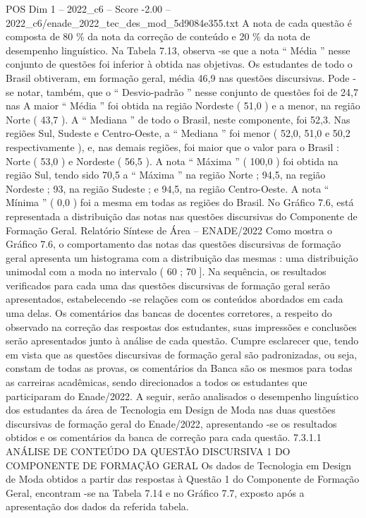 \begin{textsample}{POS Dim 1 – 2022\_c6 – Score -2.00 – 2022\_c6/enade\_2022\_tec\_des\_mod\_5d9084e355.txt}
A nota de cada questão é composta de 80 \% da nota da correção de conteúdo e 20 \% da nota de desempenho linguístico.
Na Tabela 7.13, observa -se que a nota “ Média ” nesse conjunto de questões foi inferior à obtida nas objetivas.
Os estudantes de todo o Brasil obtiveram, em formação geral, média 46,9 nas questões discursivas.
Pode -se notar, também, que o “ Desvio-padrão ” nesse conjunto de questões foi de 24,7 nas A maior “ Média ” foi obtida na região Nordeste ( 51,0 ) e a menor, na região Norte ( 43,7 ).
A “ Mediana ” de todo o Brasil, neste componente, foi 52,3.
Nas regiões Sul, Sudeste e Centro-Oeste, a “ Mediana ” foi menor ( 52,0, 51,0 e 50,2 respectivamente ), e, nas demais regiões, foi maior que o valor para o Brasil : Norte ( 53,0 ) e Nordeste ( 56,5 ).
A nota “ Máxima ” ( 100,0 ) foi obtida na região Sul, tendo sido 70,5 a “ Máxima ” na região Norte ; 94,5, na região Nordeste ; 93, na região Sudeste ; e 94,5, na região Centro-Oeste.
A nota “ Mínima ” ( 0,0 ) foi a mesma em todas as regiões do Brasil.
No Gráfico 7.6, está representada a distribuição das notas nas questões discursivas do Componente de Formação Geral.
Relatório Síntese de Área – ENADE/2022 Como mostra o Gráfico 7.6, o comportamento das notas das questões discursivas de formação geral apresenta um histograma com a distribuição das mesmas : uma distribuição unimodal com a moda no intervalo ( 60 ; 70 ].
Na sequência, os resultados verificados para cada uma das questões discursivas de formação geral serão apresentados, estabelecendo -se relações com os conteúdos abordados em cada uma delas.
Os comentários das bancas de docentes corretores, a respeito do observado na correção das respostas dos estudantes, suas impressões e conclusões serão apresentados junto à análise de cada questão.
Cumpre esclarecer que, tendo em vista que as questões discursivas de formação geral são padronizadas, ou seja, constam de todas as provas, os comentários da Banca são os mesmos para todas as carreiras acadêmicas, sendo direcionados a todos os estudantes que participaram do Enade/2022.
A seguir, serão analisados o desempenho linguístico dos estudantes da área de Tecnologia em Design de Moda nas duas questões discursivas de formação geral do Enade/2022, apresentando -se os resultados obtidos e os comentários da banca de correção para cada questão. 7.3.1.1 ANÁLISE DE CONTEÚDO DA QUESTÃO DISCURSIVA 1 DO COMPONENTE DE FORMAÇÃO GERAL Os dados de Tecnologia em Design de Moda obtidos a partir das respostas à Questão 1 do Componente de Formação Geral, encontram -se na Tabela 7.14 e no Gráfico 7.7, exposto após a apresentação dos dados da referida tabela.

\end{textsample}
